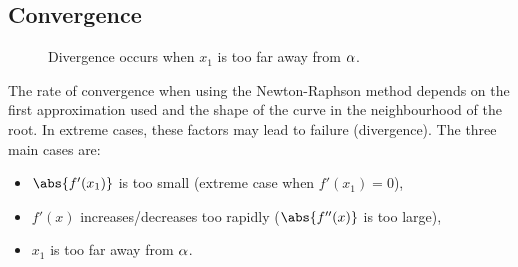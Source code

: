 \subsection{Convergence}

\begin{figure}[H]
    \centering
    \caption{Divergence occurs when $x_1$ is too far away from $\alpha$.}
\end{figure}

The rate of convergence when using the Newton-Raphson method depends on the first approximation used and the shape of the curve in the neighbourhood of the root. In extreme cases, these factors may lead to failure (divergence). The three main cases are:
\begin{itemize}
    \item $\abs{f'(x_1)}$ is too small (extreme case when $f'(x_1) = 0$),
    \item $f'(x)$ increases/decreases too rapidly ($\abs{f''(x)}$ is too large),
    \item $x_1$ is too far away from $\alpha$.
\end{itemize}